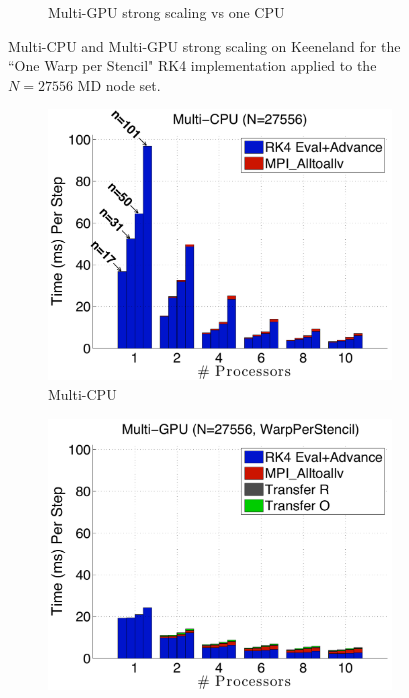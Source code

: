 \begin{figure}
\begin{subfigure}[t]{0.425\textwidth}
\caption{Multi-GPU strong scaling vs one CPU}
\label{fig:alltoall_multigpu_vs_cpu_scaling}
\end{subfigure} 
\caption{Multi-CPU and Multi-GPU strong scaling on Keeneland for the ``One Warp per Stencil" RK4 implementation applied to the $N=27556$ MD node set.}
\end{figure}



\begin{figure}
\centering
\begin{subfigure}[t]{0.425\textwidth}
\centering
\includegraphics[width=1.0\textwidth]{../figures/keeneland_results/alltoallv_cosine/multiCPU_costs.pdf}
\caption{Multi-CPU}
\label{fig:alltoall_multicpu_costs}
\end{subfigure} 
\begin{subfigure}[t]{0.425\textwidth}
\centering
\includegraphics[width=1.0\textwidth]{../figures/keeneland_results/alltoallv_cosine/multiGPU_warp_costs.pdf}

\end{subfigure}
\end{figure}
